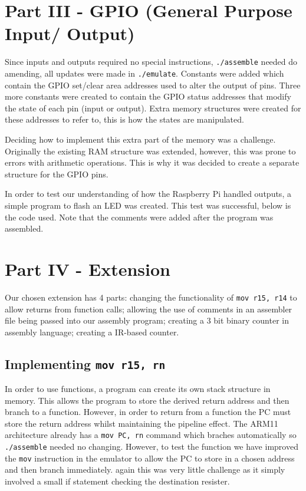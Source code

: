 \documentclass[11pt]{article}
\begin{document}
\section{Part III - GPIO (General Purpose Input/ Output)}
Since inputs and outputs required no special instructions, \texttt{./assemble} needed do amending, all updates were made in \texttt{./emulate}. Constants were added which contain the GPIO set/clear area addresses used to alter the output of pins. Three more constants were created to contain the GPIO status addresses that modify the state of each pin (input or output). Extra memory structures were created for these addresses to refer to, this is how the states are manipulated.\newline

\noindent Deciding how to implement this extra part of the memory was a challenge. Originally the existing RAM structure was extended, however, this was prone to errors with arithmetic operations. This is why it was decided to create a separate structure for the GPIO pins.\newline 

\noindent In order to test our understanding of how the Raspberry Pi handled outputs, a simple program to flash an LED was created. This test was successful, below is the code used. Note that the comments were added after the program was assembled.



\section{Part IV - Extension}
Our chosen extension has 4 parts: changing the functionality of \texttt{mov r15, r14} to allow returns from function calls; allowing the use of comments in an assembler file being passed into our assembly program; creating a 3 bit binary counter in assembly language; creating a IR-based counter.

\subsection{Implementing \texttt{mov r15, rn}}
In order to use functions, a program can create its own stack structure in memory. This allows the program to store the derived return address and then branch to a function. However, in order to return from a function the PC must store the return address whilst maintaining the pipeline effect. The ARM11 architecture already has a \texttt{mov PC, rn} command which braches automatically so \texttt{./assemble} needed no changing. However, to test the function we have improved the \texttt{mov} instruction in the emulator to allow the PC to store in a chosen address and then branch immediately. again this was very little challenge as it simply involved a small if statement checking the destination resister.  
\end{document}
